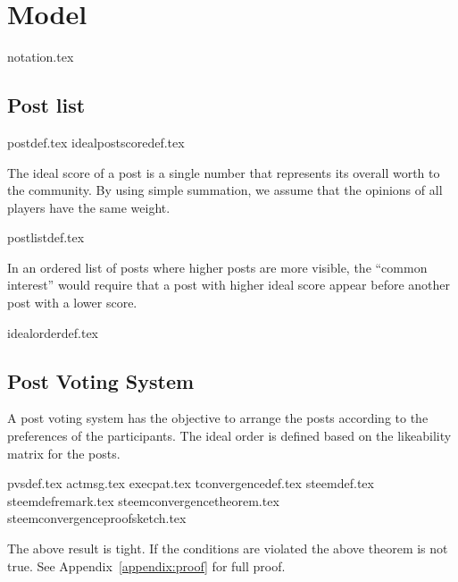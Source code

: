 \section{Model}
  {notation.tex}
  \subsection{Post list}
    {postdef.tex}
    {idealpostscoredef.tex}

    The ideal score of a post is a single number that represents its overall
    worth to the community. By using simple summation, we assume that the
    opinions of all players have the same weight.

    {postlistdef.tex}

    In an ordered list of posts where higher posts are more visible, the
    ``common interest'' would require that a post with higher ideal score appear
    before another post with a lower score.

    {idealorderdef.tex}

  \subsection{Post Voting System}
    A post voting system has the objective to arrange the posts according to the
    preferences of the participants. The ideal order is defined based on the
    likeability matrix for the posts.

    {pvsdef.tex}
    {actmsg.tex}
    {execpat.tex}
    {tconvergencedef.tex}
    {steemdef.tex}
    {steemdefremark.tex}
    {steemconvergencetheorem.tex}
    {steemconvergenceproofsketch.tex}

    The above result is tight. If the conditions are violated the above theorem
    is not true. See Appendix~\ref{appendix:proof} for full proof.
